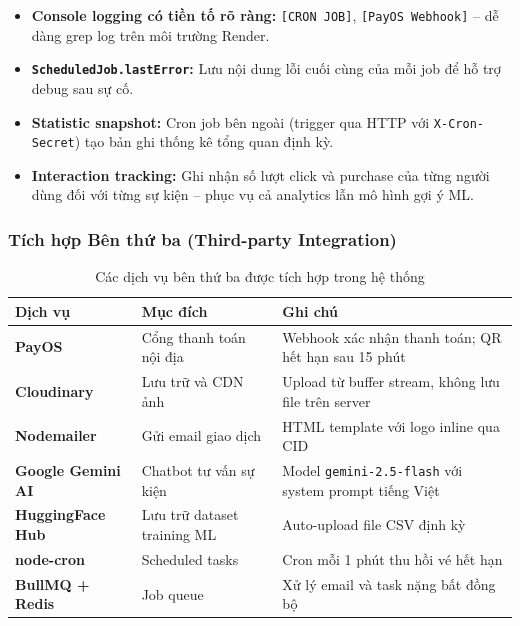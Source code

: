 \begin{itemize}[leftmargin=*, label={--}]
    \item \textbf{Console logging có tiền tố rõ ràng:}
    \texttt{[CRON JOB]}, \texttt{[PayOS Webhook]} -- dễ dàng grep log
    trên môi trường Render.

    \item \textbf{\texttt{ScheduledJob.lastError}:} Lưu nội dung lỗi cuối
    cùng của mỗi job để hỗ trợ debug sau sự cố.

    \item \textbf{Statistic snapshot:} Cron job bên ngoài (trigger qua HTTP
    với \texttt{X-Cron-Secret}) tạo bản ghi thống kê tổng quan định kỳ.

    \item \textbf{Interaction tracking:} Ghi nhận số lượt click và purchase
    của từng người dùng đối với từng sự kiện -- phục vụ cả analytics lẫn
    mô hình gợi ý ML.
\end{itemize}

\subsubsection{Tích hợp Bên thứ ba (Third-party Integration)}

\setlength{\LTleft}{0pt}
\setlength{\LTright}{0pt}
\begin{longtable}{>{\bfseries}p{3cm} p{5cm} p{6cm}}
\caption{Các dịch vụ bên thứ ba được tích hợp trong hệ thống}\\[15pt]
\toprule
\textbf{Dịch vụ} & \textbf{Mục đích} & \textbf{Ghi chú} \\
\midrule
PayOS          & Cổng thanh toán nội địa            & Webhook xác nhận thanh toán; QR hết hạn sau 15 phút \\
\midrule
Cloudinary     & Lưu trữ và CDN ảnh                 & Upload từ buffer stream, không lưu file trên server \\
\midrule
Nodemailer     & Gửi email giao dịch                & HTML template với logo inline qua CID \\
\midrule
Google Gemini AI & Chatbot tư vấn sự kiện           & Model \texttt{gemini-2.5-flash} với system prompt tiếng Việt \\
\midrule
HuggingFace Hub & Lưu trữ dataset training ML       & Auto-upload file CSV định kỳ \\
\midrule
node-cron      & Scheduled tasks                    & Cron mỗi 1 phút thu hồi vé hết hạn \\
\midrule
BullMQ + Redis & Job queue                          & Xử lý email và task nặng bất đồng bộ \\
\bottomrule
\end{longtable}

